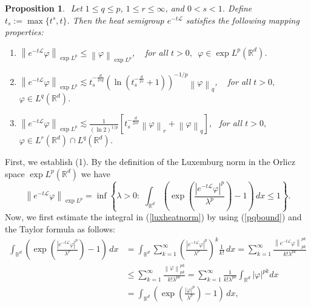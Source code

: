 \documentclass[a4paper,11pt]{amsart}
\renewcommand\eqref[1]{(\ref{#1})} %
\numberwithin{equation}{section}
\theoremstyle{plain}
\newtheorem{proposition}{Proposition}
\theoremstyle{definition}
\begin{document}
\begin{proposition}\label{techprop1}${}$
Let $1\leq q\leq p$, $1\leq r\leq\infty$, and $0<s< 1$. Define $t_s:=\max\{t^s,t\}$. Then the heat semigroup $e^{-t \mathcal{L}}$ satisfies the following mapping properties:
\begin{enumerate}
\item $\left\|e^{-t\mathcal{L}} \varphi\right\|_{\exp L^p }\leq \left\|\varphi\right\|_{\exp L^p }$, \,\,\, for all $t>0,$\, $\varphi\in {\exp L^p(\mathbb{R}^d)}$.

\item $\left\|e^{-t\mathcal{L}} \varphi\right\|_{\exp L^p }\lesssim t_s^{-\frac{d}{2s q}}\left(\ln(t_s^{-\frac{d}{2s}}+1)\right)^{-1/p}\left\|\varphi\right\|_{q}$, \,\,\, for all $t>0,$\, $\varphi\in L^q(\mathbb{R}^d)$.

\item $\left\|e^{-t\mathcal{L}} \varphi\right\|_{\exp L^p}\lesssim \frac{1}{(\ln 2)^{1/p}}\left[t_s^{-\frac{d}{2s r}}\left\|\varphi\right\|_{r}+\left\|\varphi\right\|_{q}\right]$, \, for all $t>0,$\, $\varphi\in L^r(\mathbb{R}^d)\cap L^q(\mathbb{R}^d)$.
\end{enumerate}
\end{proposition}
\proof 
First, we establish (1). By the definition of the Luxemburg norm in the Orlicz space $\exp L^{p}(\mathbb{R}^{d})$ we have 
\begin{equation} \label{luxheatnorm}
    \left\|e^{-t\mathcal{L}} \varphi\right\|_{\exp L^p}=\inf\left\{\lambda>0: \,\, \int_{\mathbb{R}^d}\left(\exp\left(\frac{|e^{-t\mathcal{L}} \varphi|^p}{\lambda^p}\right)-1\right)\,dx\leq 1\right\}.
\end{equation}
Now, we first estimate the integral in \eqref{luxheatnorm} by using \eqref{pqbound} and the Taylor formula as follows:
\begin{align*}
\int_{\mathbb{R}^d}\left(\exp\left(\frac{|e^{-t\mathcal{L}} \varphi|^p}{\lambda^p}\right)-1\right)\,dx &=\int_{\mathbb{R}^d}\sum_{k=1}^{\infty}\left(\frac{|e^{-t\mathcal{L}} \varphi|^p}{\lambda^p}\right)^{k}\frac{1}{k!}\,dx=\sum_{k=1}^{\infty}\frac{\left\|e^{-t\mathcal{L}}\varphi\right\|_{pk}^{pk}}{k!\lambda^{pk}}\\&\leq \sum_{k=1}^{\infty}\frac{\left\|
\varphi\right\|_{pk}^{pk}}{k!\lambda^{pk}}
=\sum_{k=1}^{\infty}\frac{1}{k!\lambda^{pk}}\int_{\mathbb{R}^d}|\varphi|^{pk}dx\\
&=\int_{\mathbb{R}^d}\left(\exp\left(\frac{| \varphi|^p}{\lambda^p}\right)-1\right)\,dx,
\end{align*}
\end{document}
